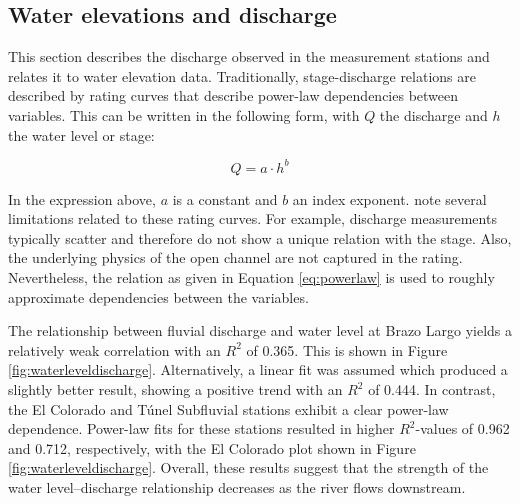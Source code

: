 \subsection{Water elevations and discharge}
This section describes the discharge observed in the measurement stations and relates it to water elevation data. Traditionally, stage-discharge relations are described by rating curves that describe power-law dependencies between variables. This can be written in the following form, with $Q$ the discharge and $h$ the water level or stage:

\begin{equation}
\label{eq:powerlaw}
    Q = a \cdot h^b
\end{equation}

In the expression above, $a$ is a constant and $b$ an index exponent. \citeauthor{schmidtStageDischargeRelationshipOpen2011} note several limitations related to these rating curves. For example, discharge measurements typically scatter and therefore do not show a unique relation with the stage. Also, the underlying physics of the open channel are not captured in the rating. Nevertheless, the relation as given in Equation \ref{eq:powerlaw} is used to roughly approximate dependencies between the variables. 

The relationship between fluvial discharge and water level at Brazo Largo yields a relatively weak correlation with an $R^2$ of 0.365. This is shown in Figure \ref{fig:waterleveldischarge}. Alternatively, a linear fit was assumed which produced a slightly better result, showing a positive trend with an $R^2$ of 0.444. In contrast, the El Colorado and Túnel Subfluvial stations exhibit a clear power-law dependence. Power-law fits for these stations resulted in higher $R^2$-values of 0.962 and 0.712, respectively, with the El Colorado plot shown in Figure \ref{fig:waterleveldischarge}. Overall, these results suggest that the strength of the water level–discharge relationship decreases as the river flows downstream.


